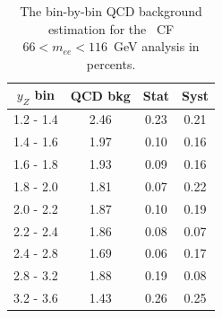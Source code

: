 \begin{figure}
\end{figure}

\begin{table}
\centering
\begin{tabular}{ cccc } \hline \hline
 $y_Z$ bin & QCD bkg & Stat & Syst \\  \hline
 1.2 -  1.4 &   2.46 &   0.23  &   0.21 \\
 1.4 -  1.6 &   1.97 &   0.10  &   0.16 \\
 1.6 -  1.8 &   1.93 &   0.09  &   0.16 \\
 1.8 -  2.0 &   1.81 &   0.07  &   0.22 \\
 2.0 -  2.2 &   1.87 &   0.10  &   0.19 \\
 2.2 -  2.4 &   1.86 &   0.08  &   0.07 \\
 2.4 -  2.8 &   1.69 &   0.06  &   0.17 \\
 2.8 -  3.2 &   1.88 &   0.19  &   0.08 \\
 3.2 -  3.6 &   1.43 &   0.26  &   0.25 \\
\hline \hline
\end{tabular}
\caption{The bin-by-bin QCD background estimation for the \Zee\ CF $66 < m_{ee} < 116$~GeV analysis in percents.}
\label{tab:bkg_qcd_peak_percents}
\end{table}

